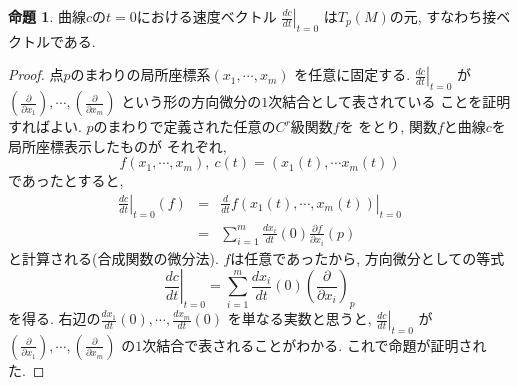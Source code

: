 \documentclass[a4j,12pt]{jarticle}
\theoremstyle{definition}
\newtheorem{proposition}[theorem]{命題}
\begin{document}
    \begin{proposition}\label{prop:dc/dt is tangent vector}
        曲線$c$の$t=0$における速度ベクトル
        $\left .\frac{dc}{dt}\right|_{t=0}$
        は$T_p(M)$の元, すなわち接ベクトルである. 
    \end{proposition}
    \begin{proof}
        点$p$のまわりの局所座標系$(x_1,\cdots ,x_m)$
        を任意に固定する. 
        $\left .\frac{dc}{dt}\right|_{t=0}$
        が$\left(\frac{\partial}{\partial x_1}\right), 
        \cdots ,
        \left(\frac{\partial}{\partial x_m}\right)$
        という形の方向微分の$1$次結合として表されている
        ことを証明すればよい. 
        $p$のまわりで定義された任意の$C^r$級関数$f$を
        をとり, 関数$f$と曲線$c$を局所座標表示したものが
        それぞれ, 
        $$f(x_1,\cdots ,x_m),\ 
        c(t)=(x_1(t),\cdots x_m(t))$$
        であったとすると, 
        \begin{eqnarray*}
            \left .\frac{dc}{dt}\right|_{t=0}(f)&=&
            \left .\frac{d}{dt}f(x_1(t),\cdots ,x_m(t))
            \right|_{t=0}\\
            &=&\sum_{i=1}^{m}\frac{dx_i}{dt}(0)
            \frac{\partial f}{\partial x_i}(p)
        \end{eqnarray*}
        と計算される(合成関数の微分法). 
        $f$は任意であったから, 方向微分としての等式
        $$\left .\frac{dc}{dt}\right|_{t=0}=
        \sum_{i=1}^{m}\frac{dx_i}{dt}(0)
            \left(\frac{\partial}{\partial x_i}
            \right)_p$$
        を得る. 右辺の$\frac{dx_1}{dt}(0), 
        \cdots ,\frac{dx_m}{dt}(0)$
        を単なる実数と思うと, 
        $\left .\frac{dc}{dt}\right|_{t=0}$
        が
        $\left(\frac{\partial}{\partial x_1}\right), 
        \cdots ,
        \left(\frac{\partial}{\partial x_m}\right)$
        の$1$次結合で表されることがわかる. 
        これで命題が証明された. 
    \end{proof}
\end{document}
